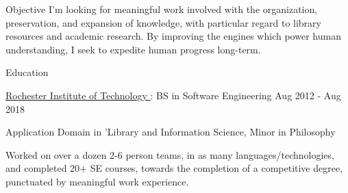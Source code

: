 \documentclass{resume} %
\begin{document}
  \begin{rSection}{Objective}
    I'm looking for meaningful work involved with the organization, preservation, and expansion of knowledge, with particular regard to library resources and academic research. By improving the engines which power human understanding, I seek to expedite human progress long-term.
  \end{rSection}

  \begin{rSection}{Education}

    \begin{rSubsection}{\underline{Rochester Institute of Technology }: BS in Software Engineering }{ Aug 2012 - Aug 2018 }{}

      \item Application Domain in 'Library and Information Science, Minor in Philosophy

      \item Worked on over a dozen 2-6 person teams, in as many languages/technologies, and completed 20+ SE courses, towards the completion of a competitive degree, punctuated by meaningful work experience.

    \end{rSubsection}

  \end{rSection}
\end{document}
